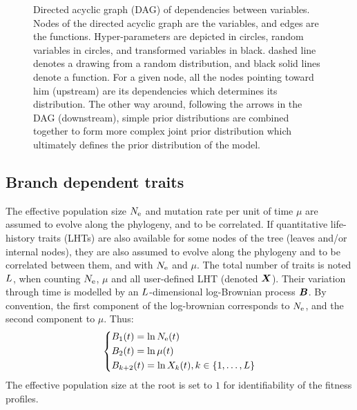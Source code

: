 \begin{figure*}[t]
    \caption[Directed acyclic graph of dependencies between variables]{
        Directed acyclic graph (DAG) of dependencies between variables.
        Nodes of the directed acyclic graph are the variables, and edges are the functions.
        Hyper-parameters are depicted in {\color{RED}{red}} circles, random variables in {\color{BLUE}{blue}} circles, and transformed variables in black.
            {\color{BLUE}{Blue}} dashed line denotes a drawing from a random distribution, and black solid lines denote a function.
        For a given node, all the nodes pointing toward him (upstream) are its dependencies which determines its distribution.
        The other way around, following the arrows in the DAG (downstream), simple {prior} distributions are combined together to form more complex joint {prior} distribution which ultimately defines the {prior} distribution of the model.
    }\label{fig:DAG-MutSelNe}
\end{figure*}

\subsection{Branch dependent traits}
The {effective population size} $N_{\text{e}}$ and mutation rate per unit of time $\mu$ are assumed to evolve along the phylogeny, and to be correlated.
If quantitative life-history traits ({LHT}s) are also available for some nodes of the tree (leaves and/or internal nodes), they are also assumed to evolve along the phylogeny and to be correlated between them, and with $N_{\text{e}}$ and $\mu$.
The total number of traits is noted $L$, when counting $N_{\text{e}}$, $\mu$ and all user-defined LHT (denoted $\bm{X}$).
Their variation through time is modelled by an $L$-dimensional log-Brownian process $\bm{B}$.
By convention, the first component of the log-brownian corresponds to $N_{\text{e}}$, and the second component to $\mu$.
Thus:
\begin{equation}
    \begin{dcases}
        B_1 (t) = \ln N_{\text{e}} (t) \\
        B_2 (t) = \ln \mu (t) \\
        B_{k+2}(t) = \ln X_k(t), k \in \{1, \hdots, L\}
    \end{dcases}
\end{equation}
The effective population size at the root is set to $1$ for identifiability of the fitness profiles.

